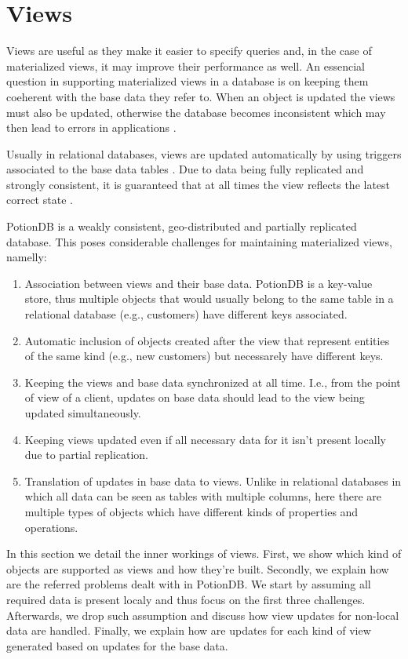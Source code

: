 \documentclass{vldb}
\begin{document}
\section{Views}
\label{subsec:viewsconsistency}

Views are useful as they make it easier to specify queries and, in the case of materialized views, it may improve their performance as well.
An essencial question in supporting materialized views in a database is on keeping them coeherent with the base data they refer to.
When an object is updated the views must also be updated, otherwise the database becomes inconsistent which may then lead to errors in applications \cite{???}.

Usually in relational databases, views are updated automatically by using triggers associated to the base data tables \cite{???}.
Due to data being fully replicated and strongly consistent, it is guaranteed that at all times the view reflects the latest correct state \cite{???}.

PotionDB is a weakly consistent, geo-distributed and partially replicated database.
This poses considerable challenges for maintaining materialized views, namelly:
\begin{enumerate}
	\item Association between views and their base data. 
	PotionDB is a key-value store, thus multiple objects that would usually belong to the same table in a relational database (e.g., customers) have different keys associated.
	\item Automatic inclusion of objects created after the view that represent entities of the same kind (e.g., new customers) but necessarely have different keys.
	\item Keeping the views and base data synchronized at all time.
	I.e., from the point of view of a client, updates on base data should lead to the view being updated simultaneously.
	\item Keeping views updated even if all necessary data for it isn't present locally due to partial replication.
	\item Translation of updates in base data to views. 
	Unlike in relational databases in which all data can be seen as tables with multiple columns, here there are multiple types of objects which have different kinds of properties and operations.
\end{enumerate}

In this section we detail the inner workings of views.
First, we show which kind of objects are supported as views and how they're built.
Secondly, we explain how are the referred problems dealt with in PotionDB.
We start by assuming all required data is present localy and thus focus on the first three challenges.
Afterwards, we drop such assumption and discuss how view updates for non-local data are handled.
Finally, we explain how are updates for each kind of view generated based on updates for the base data.
\end{document}

